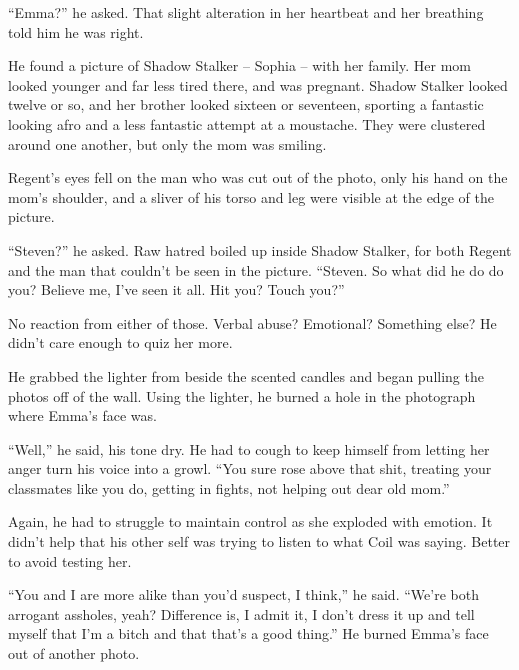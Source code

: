 ``Emma?'' he asked.  That slight alteration in her heartbeat and her breathing told him he was right.



He found a picture of Shadow Stalker – Sophia – with her family.  Her mom looked younger and far less tired there, and was pregnant.  Shadow Stalker looked twelve or so, and her brother looked sixteen or seventeen, sporting a fantastic looking afro and a less fantastic attempt at a moustache.  They were clustered around one another, but only the mom was smiling.



Regent's eyes fell on the man who was cut out of the photo, only his hand on the mom's shoulder, and a sliver of his torso and leg were visible at the edge of the picture.



``Steven?'' he asked.  Raw hatred boiled up inside Shadow Stalker, for both Regent and the man that couldn't be seen in the picture.  ``Steven.  So what did he do do you?  Believe me, I've seen it all.  Hit you?  Touch you?''



No reaction from either of those.  Verbal abuse?  Emotional?  Something else?  He didn't care enough to quiz her more.



He grabbed the lighter from beside the scented candles and began pulling the photos off of the wall.  Using the lighter, he burned a hole in the photograph where Emma's face was.



``Well,'' he said, his tone dry.  He had to cough to keep himself from letting her anger turn his voice into a growl.  ``You sure rose above that shit, treating your classmates like you do, getting in fights, not helping out dear old mom.''



Again, he had to struggle to maintain control as she exploded with emotion.  It didn't help that his other self was trying to listen to what Coil was saying.  Better to avoid testing her.



``You and I are more alike than you'd suspect, I think,'' he said. ``We're both arrogant assholes, yeah?  Difference is, I admit it, I don't dress it up and tell myself that I'm a bitch and that that's a good thing.''  He burned Emma's face out of another photo.



